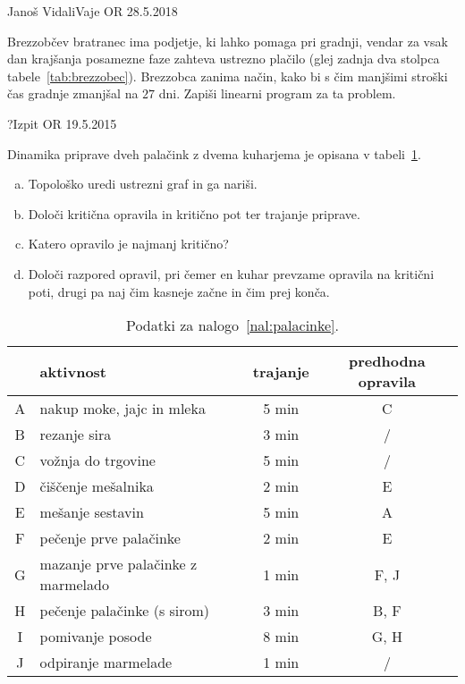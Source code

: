 \begin{naloga}{Janoš Vidali}{Vaje OR 28.5.2018}
\begin{vprasanje}
Brezzobčev bratranec ima podjetje, ki lahko pomaga pri gradnji,
vendar za vsak dan krajšanja posamezne faze zahteva ustrezno plačilo
(glej zadnja dva stolpca tabele~\ref{tab:brezzobec}).
Brezzobca zanima način,
kako bi s čim manjšimi stroški čas gradnje zmanjšal na $27$ dni.
Zapiši linearni program za ta problem.
\end{vprasanje}
\begin{odgovor}
\end{odgovor}
\end{naloga}


\begin{naloga}{?}{Izpit OR 19.5.2015}
\begin{vprasanje}
Dinamika priprave dveh palačink z dvema kuharjema
je opisana v tabeli~\ref{tab:palacinke}.
\begin{enumerate}[(a)]
\item Topološko uredi ustrezni graf in ga nariši.
\item Določi kritična opravila in kritično pot ter trajanje priprave.
\item Katero opravilo je najmanj kritično?
\item Določi razpored opravil,
pri čemer en kuhar prevzame opravila na kritični poti,
drugi pa naj čim kasneje začne in čim prej konča.
\end{enumerate}

\begin{table}[t]
\centering
\begin{tabular}{c|l|c|c}
& aktivnost & trajanje & predhodna opravila \\
\hline
A & nakup moke, jajc in mleka & 5 min & C \\
B & rezanje sira & 3 min & / \\
C & vožnja do trgovine & 5 min & / \\
D & čiščenje mešalnika & 2 min & E \\
E & mešanje sestavin & 5 min & A \\
F & pečenje prve palačinke & 2 min & E \\
G & mazanje prve palačinke z marmelado & 1 min & F, J \\
H & pečenje palačinke (s sirom) & 3 min & B, F \\
I & pomivanje posode & 8 min & G, H \\
J & odpiranje marmelade & 1 min & / \\
\end{tabular}
\caption{Podatki za nalogo~\ref{nal:palacinke}.}
\label{tab:palacinke}
\end{table}
\end{vprasanje}
\begin{odgovor}
\end{odgovor}
\end{naloga}


